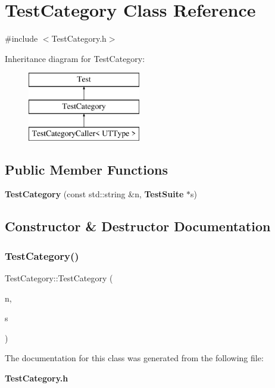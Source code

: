\section{Test\+Category Class Reference}
\label{classTestCategory}


{\ttfamily \#include $<$Test\+Category.\+h$>$}

Inheritance diagram for Test\+Category\+:\begin{figure}[H]
\begin{center}
\leavevmode
\includegraphics[height=3.000000cm]{classTestCategory}
\end{center}
\end{figure}
\subsection*{Public Member Functions}
\begin{DoxyCompactItemize}
\item 
\textbf{ Test\+Category} (const std\+::string \&n, \textbf{ Test\+Suite} $\ast$s)
\end{DoxyCompactItemize}


\subsection{Constructor \& Destructor Documentation}
\mbox{\label{classTestCategory_ab42b38437fa67ff1f4dd56321f5f8b6b}} 
\subsubsection{Test\+Category()}
{\footnotesize\ttfamily Test\+Category\+::\+Test\+Category (\begin{DoxyParamCaption}\item[{const std\+::string \&}]{n,  }\item[{\textbf{ Test\+Suite} $\ast$}]{s }\end{DoxyParamCaption})\hspace{0.3cm}{\ttfamily [inline]}}



The documentation for this class was generated from the following file\+:\begin{DoxyCompactItemize}
\item 
\textbf{ Test\+Category.\+h}\end{DoxyCompactItemize}
